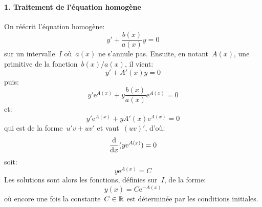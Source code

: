 \paragraph{1. Traitement de l'équation homogène}
On réécrit l'équation homogène:
\begin{equation}
y' + \frac{b(x)}{a(x)} y = 0
\end{equation}
sur un intervalle~$I$ où~$a(x)$ ne s'annule pas. Ensuite, en notant~$A(x)$, une primitive de la fonction~$b(x)/a(x)$, il vient:
\begin{equation}
y' + A'(x) y =0
\end{equation}
puis:
\begin{equation}
y' \mathrm{e}^{A(x)} + y \frac{b(x)}{a(x)} \mathrm{e}^{A(x)} =0
\end{equation}
et:
\begin{equation}
y' \mathrm{e}^{A(x)} + y A'(x) \mathrm{e}^{A(x)}=0
\end{equation}
qui est de la forme~$u' v + u v'$ et vaut~$ (u v)'$, d'où:
\begin{equation}
\frac{\mathrm d}{\text{d} x}(y \mathrm{e}^{A(x)})=0
\end{equation}
soit:
\begin{equation}
y \mathrm{e}^{A(x)} = C
\end{equation}
Les solutions sont alors les fonctions, définies sur~$I$, de la forme:
\begin{equation}\label{eq:ed:forme}
y(x) = C \mathrm{e}^{-A(x)}
\end{equation}
où encore une fois la constante~$C\in\mathbb R$ est déterminée par les conditions initiales. 
